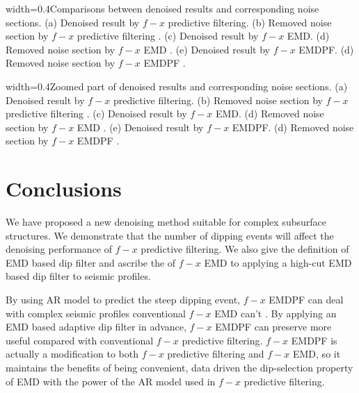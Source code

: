 {width=0.4\textwidth}{Comparisons between denoised results and corresponding noise sections. (a) Denoised result by $f-x$ predictive filtering. (b) Removed noise section by $f-x$ predictive filtering . (c) Denoised result by $f-x$ EMD. (d) Removed noise section by $f-x$ EMD . (e) Denoised result by $f-x$ EMDPF. (d) Removed noise section by $f-x$ EMDPF .}

{width=0.4\textwidth}{Zoomed part of denoised results and corresponding noise sections. (a) Denoised result by $f-x$ predictive filtering. (b) Removed noise section by $f-x$ predictive filtering . (c) Denoised result by $f-x$ EMD. (d) Removed noise section by $f-x$ EMD . (e) Denoised result by $f-x$ EMDPF. (d) Removed noise section by $f-x$ EMDPF .}

\section{Conclusions}

We have proposed a new denoising method suitable for complex subsurface structures. We demonstrate that the number of dipping events will affect the denoising performance of $f-x$ predictive filtering. We also give the definition of  EMD based dip filter and ascribe the  of $f-x$ EMD to applying a high-cut EMD based dip filter to seismic profiles.

By using  AR model to predict the steep dipping event, $f-x$ EMDPF can deal with complex seismic profiles  conventional $f-x$ EMD can't . By applying an EMD based adaptive dip filter in advance, $f-x$ EMDPF can preserve more useful  compared with conventional $f-x$ predictive filtering. $f-x$ EMDPF is actually a modification to both $f-x$ predictive filtering and $f-x$ EMD, so it maintains the benefits of  being convenient, data driven the dip-selection property of EMD with the power of the AR model used in $f-x$ predictive filtering.

